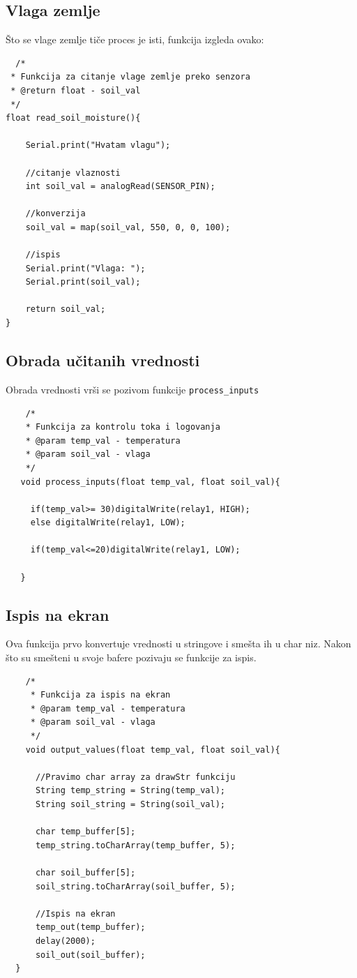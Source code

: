 \documentclass[a4paper,11pt]{book}
\begin{document}
\subsection{Vlaga zemlje}

Što se vlage zemlje tiče proces je isti, funkcija izgleda ovako:

\begin{lstlisting}
  /*
 * Funkcija za citanje vlage zemlje preko senzora
 * @return float - soil_val
 */
float read_soil_moisture(){

	Serial.print("Hvatam vlagu");

	//citanje vlaznosti
	int soil_val = analogRead(SENSOR_PIN);

	//konverzija
	soil_val = map(soil_val, 550, 0, 0, 100);

	//ispis
	Serial.print("Vlaga: ");
	Serial.print(soil_val);

	return soil_val;
}
  \end{lstlisting}

  \subsection{Obrada učitanih vrednosti}

  Obrada vrednosti vrši se pozivom funkcije \verb|process_inputs|

  \begin{lstlisting}
    /*
    * Funkcija za kontrolu toka i logovanja
    * @param temp_val - temperatura
    * @param soil_val - vlaga
    */
   void process_inputs(float temp_val, float soil_val){
   
     if(temp_val>= 30)digitalWrite(relay1, HIGH);
     else digitalWrite(relay1, LOW);
   
     if(temp_val<=20)digitalWrite(relay1, LOW);
   
   }
    \end{lstlisting}

  
    \subsection{Ispis na ekran}

    Ova funkcija prvo konvertuje vrednosti u stringove i smešta ih u char niz. Nakon što su smešteni u svoje bafere pozivaju se funkcije za ispis.

    
  \begin{lstlisting}
    /*
     * Funkcija za ispis na ekran
     * @param temp_val - temperatura
     * @param soil_val - vlaga
     */
    void output_values(float temp_val, float soil_val){

	  //Pravimo char array za drawStr funkciju
	  String temp_string = String(temp_val);
	  String soil_string = String(soil_val);

	  char temp_buffer[5];
	  temp_string.toCharArray(temp_buffer, 5);

	  char soil_buffer[5];
	  soil_string.toCharArray(soil_buffer, 5);

	  //Ispis na ekran
	  temp_out(temp_buffer);
	  delay(2000);
	  soil_out(soil_buffer);  
  }
    \end{lstlisting}
\end{document}
